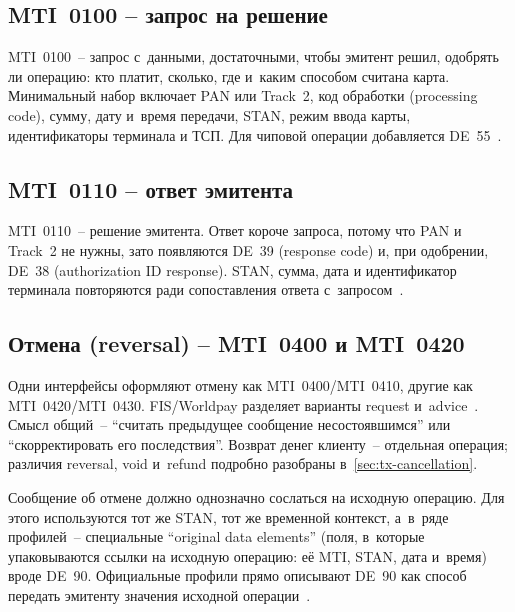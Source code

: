 \subsection*{MTI~0100 -- запрос на решение}

MTI~0100~-- запрос с~данными, достаточными, чтобы эмитент решил, одобрять ли операцию: кто платит, сколько, где и~каким способом считана карта.
Минимальный набор включает PAN или Track~2, код обработки (processing code), сумму, дату и~время передачи, STAN, режим ввода карты, идентификаторы терминала и ТСП. Для чиповой операции добавляется DE~55~\cite{fis-iso8583-guide-2023}.

\subsection*{MTI~0110 -- ответ эмитента}

MTI~0110~-- решение эмитента. Ответ короче запроса, потому что PAN и Track~2 не нужны, зато появляются DE~39 (response code) и, при одобрении, DE~38 (authorization ID response).
STAN, сумма, дата и идентификатор терминала повторяются ради сопоставления ответа с~запросом~\cite{fis-iso8583-guide-2023}.

\subsection*{Отмена (reversal) -- MTI~0400 и MTI~0420}

Одни интерфейсы оформляют отмену как MTI~0400/MTI~0410, другие как MTI~0420/MTI~0430. FIS/Worldpay разделяет варианты request и~advice~\cite{fis-iso8583-guide-2023}.
Смысл общий~-- \enquote{считать предыдущее сообщение несостоявшимся} или \enquote{скорректировать его последствия}. Возврат денег клиенту~-- отдельная операция; различия reversal,
void и~refund подробно разобраны в~\ref{sec:tx-cancellation}.

Сообщение об отмене должно однозначно сослаться на исходную операцию. Для этого используются тот же STAN, тот же временной контекст, а~в~ряде профилей~-- специальные \enquote{original data elements} (поля, в~которые упаковываются ссылки на исходную операцию: её MTI, STAN, дата и~время) вроде DE~90. Официальные профили прямо описывают DE~90 как способ передать эмитенту значения исходной операции~\cite{fis-iso8583-guide-2023}.


